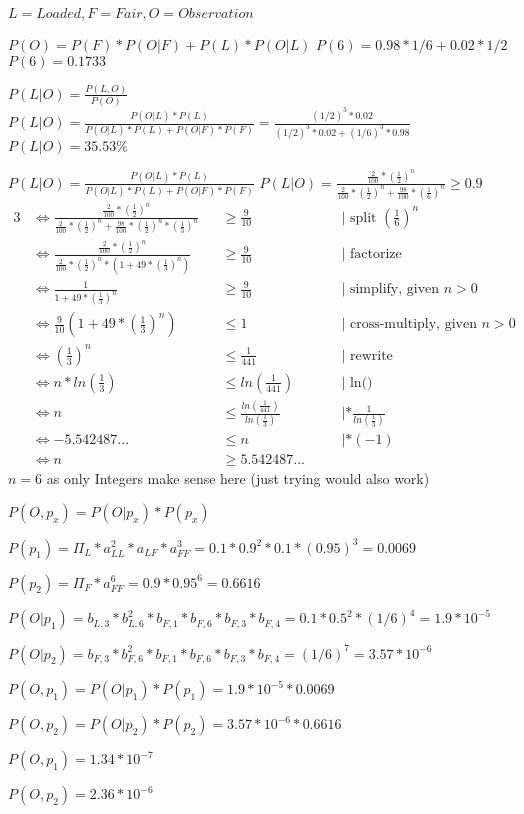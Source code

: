 $L = Loaded, F = Fair, O = Observation$

$P(O) = P(F)* P(O|F)+ P(L) * P(O|L)$
$P(6) = 0.98*1/6 + 0.02*1/2$
$P(6) = 0.1733$


$P(L|O) = \frac{P(L,O)}{P(O)}$
$P(L|O) = \frac{P(O|L)*P(L)}{P(O|L)*P(L) + P(O|F)*P(F)} = \frac{(1/2)^3*0.02}{(1/2)^3*0.02 + (1/6)^3*0.98}$
$P(L|O) = 35.53\%$


$P(L|O) = \frac{P(O|L)*P(L)}{P(O|L)*P(L) + P(O|F)*P(F)}$
$P(L|O) = \frac{\frac{2}{100}*(\frac{1}{2})^n}{\frac{2}{100}*(\frac{1}{2})^n + \frac{98}{100}*(\frac{1}{6})^n} \geq 0.9$
\begin{alignat}{3}
&\iff \frac{\frac{2}{100}*(\frac{1}{2})^n}{\frac{2}{100}*(\frac{1}{2})^n + \frac{98}{100}*(\frac{1}{2})^n * (\frac{1}{3})^n} &&\geq \frac{9}{10}  &&\quad| \text{ split } (\frac{1}{6})^n\\
&\iff \frac{\frac{2}{100}*(\frac{1}{2})^n}{\frac{2}{100}*(\frac{1}{2})^n * (1 + 49 * (\frac{1}{3})^n)} &&\geq \frac{9}{10}  &&\quad| \text{ factorize}\\
&\iff \frac{1}{1 + 49 * (\frac{1}{3})^n} &&\geq \frac{9}{10} &&\quad| \text{ simplify, given } n > 0\\
&\iff \frac{9}{10} (1 + 49 * (\frac{1}{3})^n) &&\leq 1  &&\quad| \text{ cross-multiply, given } n > 0\\
&\iff (\frac{1}{3})^n &&\leq \frac{1}{441} &&\quad| \text{ rewrite }\\
&\iff n * ln(\frac{1}{3}) &&\leq ln(\frac{1}{441}) &&\quad| \text{ ln() }\\
&\iff n &&\leq \frac{ln(\frac{1}{441})}{ln(\frac{1}{3})} &&\quad| *\frac{1}{ln(\frac{1}{3})} \\
&\iff -5.542487... &&\leq n &&\quad| * (-1)\\
&\iff n &&\geq 5.542487...
\end{alignat}
$n = 6$ as only Integers make sense here (just trying would also work)


$P(O, p_x) = P(O|p_x) * P(p_x)$


$P(p_1)=\Pi_L * a_{LL}^2 * a_{LF} * a_{FF}^3 = 0.1 * 0.9^2 * 0.1 * (0.95)^3 = 0.0069$

$P(p_2)=\Pi_F * a_{FF}^6  = 0.9 * 0.95^6 = 0.6616$

$P(O|p_1)=b_{L,3}*b_{L,6}^2*b_{F,1}*b_{F,6}*b_{F,3}*b_{F,4} = 0.1 * 0.5^2 * (1/6)^4 = 1.9 * 10^{-5}$

$P(O|p_2)=b_{F,3}*b_{F,6}^2*b_{F,1}*b_{F,6}*b_{F,3}*b_{F,4} = (1/6)^7 = 3.57 * 10^{-6}$

$P(O,p_1)=P(O|p_1)*P(p_1)= 1.9 * 10^{-5} * 0.0069$

$P(O,p_2)=P(O|p_2)*P(p_2)= 3.57 * 10^{-6} * 0.6616$


$P(O,p_1)= 1.34 * 10^{-7}$

$P(O,p_2)= 2.36 * 10^{-6}$

